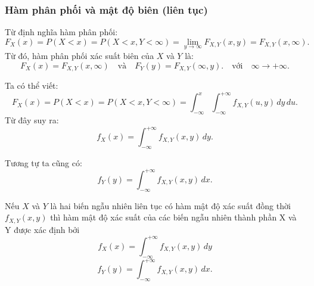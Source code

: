 \documentclass[12pt,a4paper]{article}
\begin{document}
\subsubsection{Hàm phân phối và mật độ biên (liên tục)}

\begin{dinhnghia}
Từ định nghĩa hàm phân phối:
\[
  F_X(x) = P(X < x) = P(X < x, Y < \infty) = \lim_{y \to \infty} F_{X,Y}(x, y) = F_{X,Y}(x, \infty).
\]
Từ đó, hàm phân phối xác suất biên của $X$ và $Y$ là:
\[
  F_X(x) = F_{X,Y}(x, \infty) \quad \text{và} \quad F_Y(y) = F_{X,Y}(\infty, y). \quad \text{với} \quad \infty \to +\infty.
\]

Ta có thể viết:
\[
  F_X(x) = P(X < x) = P(X < x, Y < \infty) = \int_{-\infty}^{x} \int_{-\infty}^{+\infty} f_{X,Y}(u, y) \, dy \, du.
\]
Từ đây suy ra:
\[
  f_X(x) = \displaystyle\int_{-\infty}^{+\infty} f_{X,Y}(x, y) \, dy.
\]

Tương tự ta cũng có:
\[
  f_Y(y) = \displaystyle\int_{-\infty}^{+\infty} f_{X,Y}(x, y) \, dx.
\]
\end{dinhnghia}

\begin{dinhly}  
Nếu $X$ và $Y$ là hai biến ngẫu nhiên liên tục có hàm mật độ xác suất đồng thời $f_{X,Y}(x, y)$ thì hàm mật độ xác suất của các biến ngẫu nhiên thành phần X và Y được xác định bởi
\[
  f_X(x) = \displaystyle\int_{-\infty}^{+\infty} f_{X,Y}(x, y) \, dy
\]
\[
  f_Y(y) = \displaystyle\int_{-\infty}^{+\infty} f_{X,Y}(x, y) \, dx.
\]
\end{dinhly}
\end{document}
